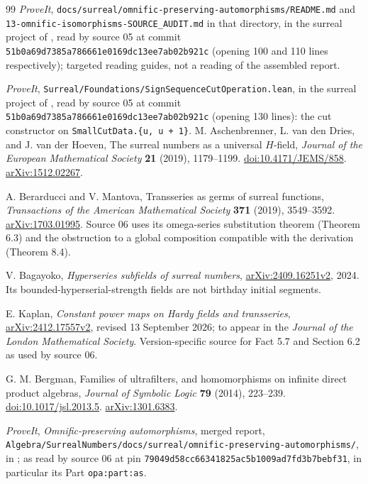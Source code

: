 \documentclass[11pt,a4paper]{article}
\numberwithin{equation}{section}
\theoremstyle{plain}
\theoremstyle{definition}
\theoremstyle{remark}
\newcommand{\code}[1]{\texttt{\small #1}}
\newcommand{\lbl}[1]{\nolinkurl{#1}}%
\newcommand{\fn}[1]{\nolinkurl{#1}}%
\begin{document}
\begin{thebibliography}{99}
\emph{ProveIt}, \code{docs/surreal/omnific-preserving-automorphisms/README.md}
and \code{13-omnific-isomorphisms-SOURCE\_AUDIT.md} in that directory, in
the surreal project of \cite{RepoMain}, read by source 05 at commit
\code{51b0a69d7385a786661e0169dc13ee7ab02b921c} (opening 100 and 110 lines
respectively); targeted reading guides, not a reading of the assembled report.

\emph{ProveIt}, \code{Surreal/Foundations/SignSequenceCutOperation.lean}, in
the surreal project of \cite{RepoMain}, read by source 05 at commit
\code{51b0a69d7385a786661e0169dc13ee7ab02b921c} (opening 130 lines):
the cut constructor on \code{SmallCutData.\{u, u + 1\}}.
M. Aschenbrenner, L. van den Dries, and J. van der Hoeven,
The surreal numbers as a universal $H$-field,
\emph{Journal of the European Mathematical Society} \textbf{21} (2019),
1179--1199.
\href{https://doi.org/10.4171/JEMS/858}{doi:10.4171/JEMS/858}.
\href{https://arxiv.org/abs/1512.02267}{arXiv:1512.02267}.

A. Berarducci and V. Mantova, Transseries as germs of surreal functions,
\emph{Transactions of the American Mathematical Society} \textbf{371}
(2019), 3549--3592.
\href{https://arxiv.org/abs/1703.01995}{arXiv:1703.01995}.
Source 06 uses its omega-series substitution theorem (Theorem 6.3) and the
obstruction to a global composition compatible with the derivation
(Theorem 8.4).

V. Bagayoko, \emph{Hyperseries subfields of surreal numbers},
\href{https://arxiv.org/abs/2409.16251v2}{arXiv:2409.16251v2}, 2024.
Its bounded-hyperserial-strength fields are not birthday initial segments.

E. Kaplan, \emph{Constant power maps on Hardy fields and transseries},
\href{https://arxiv.org/abs/2412.17557v2}{arXiv:2412.17557v2}, revised
13 September 2026; to appear in the \emph{Journal of the London
Mathematical Society}. Version-specific source for Fact 5.7 and Section 6.2
as used by source 06.

G. M. Bergman, Families of ultrafilters, and homomorphisms on infinite
direct product algebras, \emph{Journal of Symbolic Logic} \textbf{79}
(2014), 223--239.
\href{https://doi.org/10.1017/jsl.2013.5}{doi:10.1017/jsl.2013.5}.
\href{https://arxiv.org/abs/1301.6383}{arXiv:1301.6383}.

\emph{ProveIt}, \emph{Omnific-preserving automorphisms}, merged report,
\fn{Algebra/SurrealNumbers/docs/surreal/omnific-preserving-automorphisms/},
in \cite{RepoMain}; as read by source 06 at pin
\code{79049d58cc66341825ac5b1009ad7fd3b7bebf31}, in particular its Part
\lbl{opa:part:as}.


\end{thebibliography}
\end{document}
